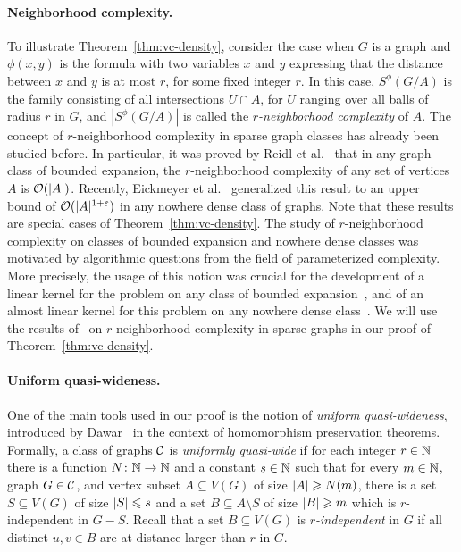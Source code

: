 \paragraph{Neighborhood complexity.}
To illustrate Theorem~\ref{thm:vc-density}, consider the case when
$G$ is a graph and  $\phi(x,y)$ is the formula with two variables $x$ and $y$ expressing that the distance between $x$ and $y$
is at most $r$, for some fixed integer $r$. In this case, $S^\phi(G/A)$ is the family consisting of all intersections $U\cap A$, for $U$ ranging over all balls of radius $r$ in $G$,
and  $|S^\phi(G/A)|$ is called the \emph{$r$-neighborhood complexity} of $A$.
The concept of $r$-neighborhood complexity in sparse graph classes has already been studied before.
In particular, it was proved by Reidl et al.~\cite{reidl2016characterising} that in any graph class of bounded expansion, the $r$-neighborhood complexity of any set of vertices $A$ is $\mathcal{O}(|A|)$.
Recently, Eickmeyer et al.~\cite{eickmeyer2016neighborhood} generalized this result to an upper bound of $\mathcal{O}(|A|^{1+\varepsilon})$ in any nowhere dense class of graphs.
Note that these results are special cases of Theorem~\ref{thm:vc-density}.
%
The study of $r$-neighborhood complexity on classes of bounded expansion and nowhere dense classes was motivated by algorithmic questions from the field of parameterized complexity.
More precisely, the usage of this notion was crucial for the development of a linear kernel for the {} problem on any class of bounded expansion~\cite{drange2016kernelization},
and of an almost linear kernel for this problem on any nowhere dense class~\cite{eickmeyer2016neighborhood}.
We will use the results of~\cite{drange2016kernelization,eickmeyer2016neighborhood,reidl2016characterising} on $r$-neighborhood complexity in sparse graphs in our proof of Theorem~\ref{thm:vc-density}.

\paragraph{Uniform quasi-wideness.}
One of the main tools used in our proof 
is the notion of \emph{uniform quasi-wideness},
introduced by Dawar~\cite{dawar2010homomorphism}
in the context of homomorphism preservation theorems.
%
Formally, a class of graphs $\mathcal{C}$  is \emph{uniformly quasi-wide} if for each integer $r\in\mathbb{N}$ there is a function
 $N\colon \mathbb{N}\rightarrow \mathbb{N}$ and a constant  $s\in \mathbb{N}$ such
that for every $m\in \mathbb{N}$, graph $G\in \mathcal{C}$, and vertex subset $A\subseteq V(G)$ of size $\left\lvert A\right\rvert\geqslant N(m)$,
there is a set $S\subseteq V(G)$ of size $\left\lvert S\right\rvert\leqslant s$ and a set
$B\subseteq A\setminus S$ of size $\left\lvert B\right\rvert\geqslant m$ which is $r$-independent in
$G-S$. Recall that a set $B\subseteq V(G)$ is {\em{$r$-independent}} in $G$ if all
distinct $u,v\in B$ are at distance 
larger than $r$ in $G$.

